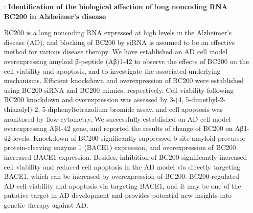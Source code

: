\documentclass[11pt]{article}
\begin{document}
\cite{li2018identification}: \textbf{Identification of the biological affection of long noncoding RNA BC200 in Alzheimer’s disease}

BC200 is a long noncoding RNA expressed at high levels in the Alzheimer’s disease (AD), and blocking of BC200 by siRNA is assumed to be an effective method for various disease therapy. 
We have established an AD cell model overexpressing amyloid β-peptide (Aβ)1-42 to observe the effects of BC200 on the cell viability and apoptosis, and to investigate the associated underlying mechanisms. 
Efficient knockdown and overexpression of BC200 were established using BC200 siRNA and BC200 mimics, respectively. 
Cell viability following BC200 knockdown and overexpression was assessed by 3-(4, 5-dimethyl-2-thiazolyl)-2, 5-diphenyltetrazolium bromide assay, and cell apoptosis was monitored by flow cytometry. 
We successfully established an AD cell model overexpressing Aβ1-42 gene, and reported the results of change of BC200 on Aβ1-42 levels. 
Knockdown of BC200 significantly suppressed b-site amyloid precursor protein-cleaving enzyme 1 (BACE1) expression, and overexpression of BC200 increased BACE1 expression. 
Besides, inhibition of BC200 significantly increased cell viability and reduced cell apoptosis in the AD model via directly targeting BACE1, which can be increased by overexpression of BC200. 
BC200 regulated AD cell viability and apoptosis via targeting BACE1, and it may be one of the putative target in AD development and provides potential new insights into genetic therapy against AD.



\end{document}
